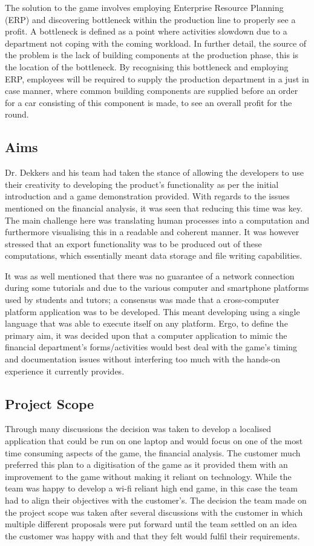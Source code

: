 \documentclass{l3proj}
\begin{document}
The solution to the game involves employing Enterprise Resource Planning (ERP) and discovering bottleneck within the production line to properly see a profit. A bottleneck is defined as a point where activities slowdown due to a department not coping with the coming workload. In further detail, the source of the problem is the lack of building components at the production phase, this is the location of the bottleneck. By recognising this bottleneck and employing ERP, employees will be required to supply the production department in a just in case manner, where common building components are supplied before an order for a car consisting of this component is made, to see an overall profit for the round.

\subsection{Aims}
Dr. Dekkers and his team had taken the stance of allowing the developers to use their creativity to developing the product's functionality as per the initial introduction and a game demonstration provided. With regards to the issues mentioned on the financial analysis, it was seen that reducing this time was key. The main challenge here was translating human processes into a computation and furthermore visualising this in a readable and coherent manner. It was however stressed that an export functionality was to be produced out of these computations, which essentially meant data storage and file writing capabilities.
    
It was as well mentioned that there was no guarantee of a network connection during some tutorials and due to the various computer and smartphone platforms used by students and tutors; a consensus was made that a cross-computer platform application was to be developed. This meant developing using a single language that was able to execute itself on any platform.
Ergo, to define the primary aim, it was decided upon that a computer application to mimic the financial department's forms/activities would best deal with the game's timing and documentation issues without interfering too much with the hands-on experience it currently provides.

\subsection{Project Scope}
 Through many discussions the decision was taken to develop a localised application that could be run on one laptop and would focus on one of the most time consuming aspects of the game, the financial analysis. The customer much preferred this plan to a digitisation of the game as it provided them with an improvement to the game without making it reliant on technology. While the team was happy to develop a wi-fi reliant high end game, in this case the team had to align their objectives with the customer's. The decision the team made on the project scope was taken after several discussions with the customer in which multiple different proposals were put forward until the team settled on an idea the customer was happy with and that they felt would fulfil their requirements.
\end{document}
